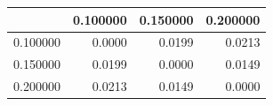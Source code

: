 \begin{tabular}{lrrr}
\toprule
 & 0.100000 & 0.150000 & 0.200000 \\
\midrule
0.100000 & 0.0000 & 0.0199 & 0.0213 \\
0.150000 & 0.0199 & 0.0000 & 0.0149 \\
0.200000 & 0.0213 & 0.0149 & 0.0000 \\
\bottomrule
\end{tabular}
